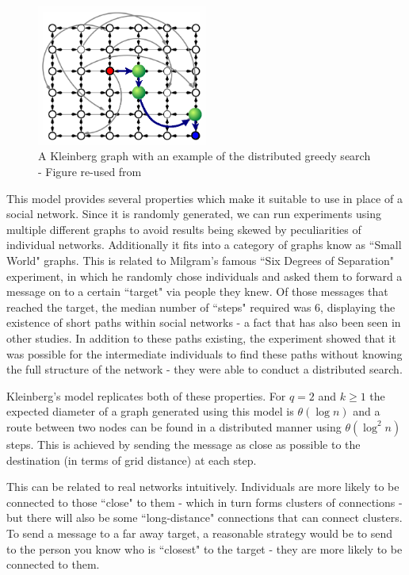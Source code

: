 \documentclass[bsc,frontabs,twoside,singlespacing,parskip,deptreport]{infthesis}     %
\begin{document}
\begin{figure}[]
  \centering
    \includegraphics[width=0.5\textwidth]{Schabanel11_Kleinbergs_Network}
  \caption{A Kleinberg graph with an example of the distributed greedy search - Figure re-used from \cite{Schabanel11}}
\end{figure}

This model provides several properties which make it suitable to use in place of a social network. Since it is randomly generated, we can run experiments using multiple different graphs to avoid results being skewed by peculiarities of individual networks. Additionally it fits into a category of graphs know as ``Small World" graphs. This is related to Milgram's famous ``Six Degrees of Separation" experiment\cite{Milgram67,TraversMilgram69}, in which he randomly chose individuals and asked them to forward a message on to a certain ``target" via people they knew. Of those messages that reached the target, the median number of ``steps" required was 6, displaying the existence of short paths within social networks - a fact that has also been seen in other studies\cite{MilgramBackup1,MilgramBackup2}. In addition to these paths existing, the experiment showed that it was possible for the intermediate individuals to find these paths without knowing the full structure of the network - they were able to conduct a distributed search. 

Kleinberg's model replicates both of these properties. For $q = 2$ and $k \ge 1$ the expected diameter of a graph generated using this model is $\theta (\log n)$ and a route between two nodes can be found in a distributed manner using $\theta (\log^{2}n)$ steps\cite{AnalyzingKleinberg}. This is achieved by sending the message as close as possible to the destination (in terms of grid distance) at each step.

This can be related to real networks intuitively. Individuals are more likely to be connected to those ``close" to them - which in turn forms clusters of connections - but there will also be some ``long-distance" connections that can connect clusters. To send a message to a far away target, a reasonable strategy would be to send to the person you know who is ``closest" to the target - they are more likely to be connected to them.
\end{document}
